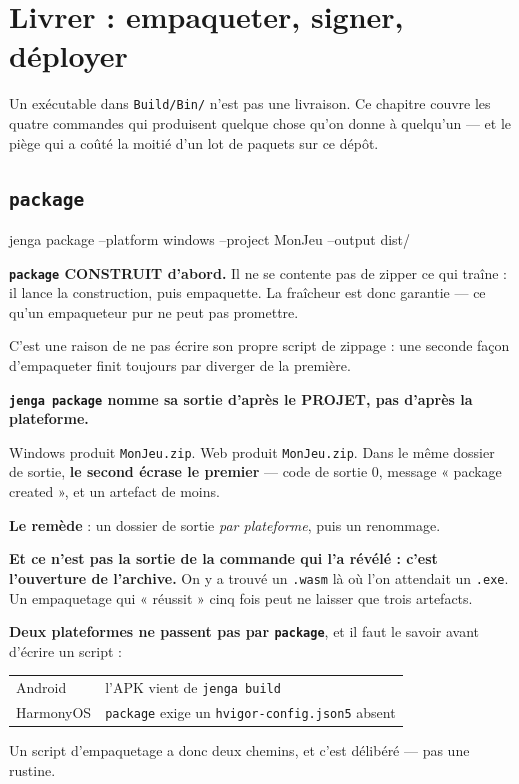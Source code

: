 \chapter{Livrer : empaqueter, signer, déployer}

Un exécutable dans \texttt{Build/Bin/} n'est pas une livraison. Ce chapitre
couvre les quatre commandes qui produisent quelque chose qu'on donne à quelqu'un
--- et le piège qui a coûté la moitié d'un lot de paquets sur ce dépôt.

\section{\texttt{package}}

\begin{nkcode}{}
jenga package --platform windows --project MonJeu --output dist/
\end{nkcode}

\begin{nkretenir}
\textbf{\texttt{package} CONSTRUIT d'abord.} Il ne se contente pas de zipper ce
qui traîne : il lance la construction, puis empaquette. La fraîcheur est donc
garantie --- ce qu'un empaqueteur pur ne peut pas promettre.

C'est une raison de ne pas écrire son propre script de zippage : une seconde
façon d'empaqueter finit toujours par diverger de la première.
\end{nkretenir}

\begin{nkpiege}
\textbf{\texttt{jenga package} nomme sa sortie d'après le PROJET, pas d'après la
plateforme.}

Windows produit \texttt{MonJeu.zip}. Web produit \texttt{MonJeu.zip}. Dans le
même dossier de sortie, \textbf{le second écrase le premier} --- code de sortie
0, message « package created », et un artefact de moins.

\textbf{Le remède} : un dossier de sortie \emph{par plateforme}, puis un
renommage.

\alerte{} \textbf{Et ce n'est pas la sortie de la commande qui l'a révélé : c'est
l'ouverture de l'archive.} On y a trouvé un \texttt{.wasm} là où l'on attendait
un \texttt{.exe}. Un empaquetage qui « réussit » cinq fois peut ne laisser que
trois artefacts.
\end{nkpiege}

\begin{nkretenir}
\textbf{Deux plateformes ne passent pas par \texttt{package}}, et il faut le
savoir avant d'écrire un script :

\begin{center}
\begin{tabular}{@{}ll@{}}
\toprule
Android & l'APK vient de \texttt{jenga build} \\
HarmonyOS & \texttt{package} exige un \texttt{hvigor-config.json5} absent \\
\bottomrule
\end{tabular}
\end{center}

Un script d'empaquetage a donc deux chemins, et c'est délibéré --- pas une
rustine.
\end{nkretenir}

